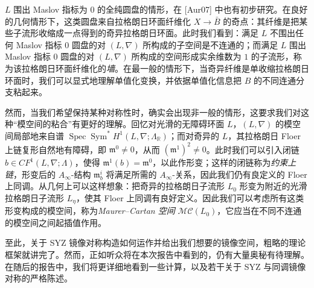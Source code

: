 $L$ 围出 Maslov 指标为 $0$ 的全纯圆盘的情形，在 [Aur07] 中也有初步研究。在良好的几何情形下，这类圆盘来自拉格朗日环面纤维化 $X\to\bar{B}$ 的奇点：其纤维是把某些子流形收缩成一点得到的奇异拉格朗日环面。此时我们看到：满足 $L$ 不围出任何 Maslov 指标 $0$ 圆盘的对 $(L,\nabla)$ 所构成的子空间是不连通的；而满足 $L$ 围出 Maslov 指标 $0$ 圆盘的对 $(L,\nabla)$ 所构成的空间形成实余维数为 $1$ 的子流形，称为该拉格朗日环面纤维化的\emph{墙}。在最一般的情形下，当奇异纤维是单收缩拉格朗日环面时，我们可以显式地理解单值化变换，并依据单值化信息把 $B$ 的不同连通分支粘起来。


然而，当我们希望保持某种对称性时，确实会出现非一般的情形，这要求我们对这种“模空间的粘合”有更好的理解。回忆对光滑的无障碍环面 $L$，$(L,\nabla)$ 的模空间局部地来自谱 $\operatorname{Spec}\operatorname{Sym}^{\ast}H^1(L,\nabla;\Lambda_{\mathbb{R}})$；而对奇异的 $L$，其拉格朗日 Floer 上链复形自然地有障碍，即 $\mathfrak{m}^0\neq 0$，从而 $(\mathfrak{m}^1)^2\neq 0$。此时我们可以引入闭链 $b\in CF^1(L,\nabla;\Lambda)$，使得 $\mathfrak{m}^1(b)=\mathfrak{m}^0$，以此作形变；这样的闭链称为\emph{约束上链}，形变后的 $A_{\infty}$-结构 $\mathfrak{m}^i_b$ 将满足所需的 $A_{\infty}$-关系，因此我们仍有良定义的 Floer 上同调。从几何上可以这样想象：把奇异的拉格朗日子流形 $L_0$ 形变为附近的光滑拉格朗日子流形 $L_{\eta}$，使其 Floer 上同调有良好定义。因此我们可以考虑所有这类形变构成的模空间，称为\emph{Maurer--Cartan 空间} $\mathcal{MC}(L_0)$，它应当在不同不连通的模空间之间起插值作用。


至此，关于 SYZ 镜像对称构造如何运作并给出我们想要的镜像空间，粗略的理论框架就讲完了。然而，正如听众将在本次报告中看到的，仍有大量奥秘有待理解。在随后的报告中，我们将更详细地看到一些计算，以及若干关于 SYZ 与同调镜像对称的严格陈述。
